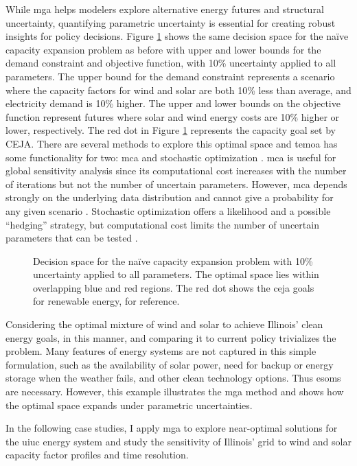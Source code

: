 While \gls{mga} helps modelers explore alternative energy futures and structural
uncertainty, quantifying parametric uncertainty is essential for creating robust insights
for policy decisions. Figure \ref{fig:param-fig} shows the same decision space for
the na\"{i}ve capacity expansion problem as before with upper and lower bounds for
the demand constraint and objective function, with 10\% uncertainty applied to all
parameters. The upper bound for the demand constraint represents a scenario where
the capacity factors for wind and solar are both 10\% less than average, and electricity
demand is 10\% higher. The upper and lower bounds on the objective function represent
futures where solar and wind energy costs are 10\% higher or lower, respectively. The
red dot in Figure \ref{fig:param-fig} represents the
capacity goal set by CEJA. There are several methods to explore this optimal space and
\gls{temoa} has some functionality for two: \gls{mca} \cite{yue_review_2018} and
stochastic optimization \cite{decarolis_multi-stage_2012, bennett_extending_2021}.
\gls{mca} is useful for global sensitivity analysis since its computational
cost increases with the number of iterations but not the number of uncertain
parameters. However, \gls{mca} depends strongly on the underlying data distribution
and cannot give a probability for any given scenario \cite{yue_review_2018}.
Stochastic optimization offers a likelihood and a possible ``hedging'' strategy,
but computational cost limits the number of uncertain parameters that can be
tested \cite{yue_review_2018}.

\begin{figure}[H]
  \centering
  \resizebox{0.8\columnwidth}{!}{}
  \caption{Decision space for the na\"{i}ve capacity expansion problem with
  10\% uncertainty applied to all parameters. The optimal space lies within
  overlapping blue and red regions. The red dot shows the \gls{ceja} goals for
  renewable energy, for reference.}
  \label{fig:param-fig}
\end{figure}
Considering the optimal mixture of wind and solar to achieve Illinois' clean
energy goals, in this manner, and comparing it to current policy trivializes the
problem.
Many features of energy systems are not captured in this simple formulation,
such as the availability of solar power, need for backup or energy storage when
the weather fails, and other clean technology options. Thus \glspl{esom} are necessary.
However, this example illustrates the \gls{mga} method and shows how the optimal space
expands under parametric uncertainties.

In the following case studies, I apply \gls{mga} to explore near-optimal solutions
for the \gls{uiuc} energy system and study the sensitivity of Illinois' grid to
wind and solar capacity factor profiles and time resolution.
